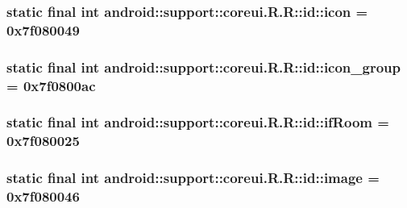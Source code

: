 \hypertarget{classandroid_1_1support_1_1coreui_1_1_r_1_1id_e74ea57a2de7027d4f61e12fc8e0dee1}{
\subsubsection[{icon}]{\setlength{\rightskip}{0pt plus 5cm}static final int android::support::coreui.R.R::id::icon = 0x7f080049}}
\label{classandroid_1_1support_1_1coreui_1_1_r_1_1id_e74ea57a2de7027d4f61e12fc8e0dee1}


\hypertarget{classandroid_1_1support_1_1coreui_1_1_r_1_1id_8a504073c54b5d796ba2d834309a0c17}{
\subsubsection[{icon\_\-group}]{\setlength{\rightskip}{0pt plus 5cm}static final int android::support::coreui.R.R::id::icon\_\-group = 0x7f0800ac}}
\label{classandroid_1_1support_1_1coreui_1_1_r_1_1id_8a504073c54b5d796ba2d834309a0c17}


\hypertarget{classandroid_1_1support_1_1coreui_1_1_r_1_1id_113729ca1541cf042f15bb47d4d8e18c}{
\subsubsection[{ifRoom}]{\setlength{\rightskip}{0pt plus 5cm}static final int android::support::coreui.R.R::id::ifRoom = 0x7f080025}}
\label{classandroid_1_1support_1_1coreui_1_1_r_1_1id_113729ca1541cf042f15bb47d4d8e18c}


\hypertarget{classandroid_1_1support_1_1coreui_1_1_r_1_1id_a2692b8c69376af6627788851cd3c48f}{
\subsubsection[{image}]{\setlength{\rightskip}{0pt plus 5cm}static final int android::support::coreui.R.R::id::image = 0x7f080046}}
\label{classandroid_1_1support_1_1coreui_1_1_r_1_1id_a2692b8c69376af6627788851cd3c48f}



